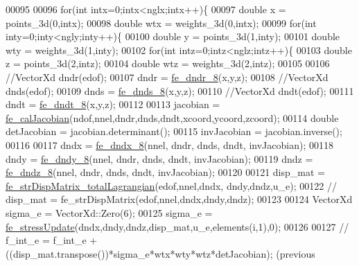 \begin{DoxyCode}
00095 
00096     \textcolor{keywordflow}{for}(\textcolor{keywordtype}{int} intx=0;intx<nglx;intx++)\{
00097         \textcolor{keywordtype}{double} x = points\_3d(0,intx);
00098         \textcolor{keywordtype}{double} wtx = weights\_3d(0,intx);
00099         \textcolor{keywordflow}{for}(\textcolor{keywordtype}{int} inty=0;inty<ngly;inty++)\{
00100             \textcolor{keywordtype}{double} y = points\_3d(1,inty);
00101             \textcolor{keywordtype}{double} wty = weights\_3d(1,inty);
00102             \textcolor{keywordflow}{for}(\textcolor{keywordtype}{int} intz=0;intz<nglz;intz++)\{
00103                 \textcolor{keywordtype}{double} z = points\_3d(2,intz);
00104                 \textcolor{keywordtype}{double} wtz = weights\_3d(2,intz);
00105 
00106                 \textcolor{comment}{//VectorXd dndr(edof);}
00107                 dndr = \hyperlink{functions_8h_afc547bef246c057db6cbd04bf7f866a9}{fe\_dndr\_8}(x,y,z);
00108                 \textcolor{comment}{//VectorXd dnds(edof);}
00109                 dnds = \hyperlink{functions_8h_ac0b5524525e1f2e89bb064c15ab8e664}{fe\_dnds\_8}(x,y,z);
00110                 \textcolor{comment}{//VectorXd dndt(edof);}
00111                 dndt = \hyperlink{functions_8h_a57e8e5c9f740c98e4767f29c121c2d0a}{fe\_dndt\_8}(x,y,z);
00112 
00113                 jacobian = \hyperlink{functions_8h_a5ae3771e65b4a0d177097041a4349c28}{fe\_calJacobian}(ndof,nnel,dndr,dnds,dndt,xcoord,ycoord,zcoord);
00114                 \textcolor{keywordtype}{double} detJacobian = jacobian.determinant();
00115                 invJacobian = jacobian.inverse();
00116 
00117                 dndx = \hyperlink{functions_8h_afc6be1a5667e68156cb099e8da71170f}{fe\_dndx\_8}(nnel, dndr, dnds, dndt, invJacobian);
00118                 dndy = \hyperlink{functions_8h_a0572d7818e085c67f7fbb84eef8ecfb4}{fe\_dndy\_8}(nnel, dndr, dnds, dndt, invJacobian);
00119                 dndz = \hyperlink{functions_8h_aaf75db8433433807839c6ea17f2cf72c}{fe\_dndz\_8}(nnel, dndr, dnds, dndt, invJacobian);
00120 
00121                 disp\_mat = \hyperlink{functions_8h_a8c9fd519c93c847cdf52de947964eb67}{fe\_strDispMatrix\_totalLagrangian}(edof,nnel,dndx,
      dndy,dndz,u\_e);
00122                 \textcolor{comment}{// disp\_mat = fe\_strDispMatrix(edof,nnel,dndx,dndy,dndz);}
00123 
00124                 VectorXd sigma\_e = VectorXd::Zero(6);
00125                 sigma\_e = \hyperlink{functions_8h_a7d0fd8cfef8b891901eb6f0f780fd9f2}{fe\_stressUpdate}(dndx,dndy,dndz,disp\_mat,u\_e,elements(i,1),0);
00126 
00127                 \textcolor{comment}{// f\_int\_e = f\_int\_e + ((disp\_mat.transpose())*sigma\_e*wtx*wty*wtz*detJacobian); (previous
}
\end{DoxyCode}
